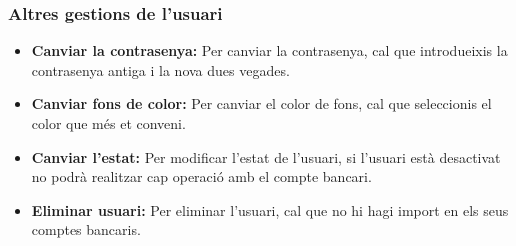 \documentclass[a4paper,12pt,twoside]{ThesisStyle}
\begin{document}
\subsubsection{Altres gestions de l'usuari}
\label{subsubsec:Gestió de l'usuari}

\begin{itemize}
    \item \textbf{Canviar la contrasenya:} Per canviar la contrasenya, cal que introdueixis la contrasenya antiga i la nova dues vegades.
    \item \textbf{Canviar fons de color:} Per canviar el color de fons, cal que seleccionis el color que més et conveni.
    \item \textbf{Canviar l'estat:} Per modificar l'estat de l'usuari, si l'usuari està desactivat no podrà realitzar cap operació amb el compte bancari.
    \item \textbf{Eliminar usuari:} Per eliminar l'usuari, cal que no hi hagi import en els seus comptes bancaris.
\end{itemize}
\end{document}
